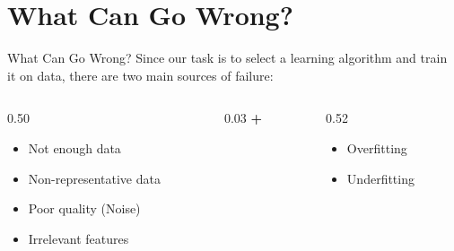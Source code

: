 \section{What Can Go Wrong?}
\begin{frame}{What Can Go Wrong?}
    Since our task is to select a learning algorithm and train it on data, there are two main sources of failure:
    \vspace{1em}
    \begin{columns}[c]
        \begin{column}{0.50\textwidth}
            \centering
            \begin{tcolorbox}[colback=red!5, colframe=red!60, title=\textbf{1. Bad Data}]
                \begin{itemize}
                    \item Not enough data
                    \item Non-representative data
                    \item Poor quality (Noise)
                    \item Irrelevant features
                \end{itemize}
            \end{tcolorbox}
        \end{column}
        \begin{column}{0.03\textwidth}
            \centering \textbf{+}
        \end{column}
        \begin{column}{0.52\textwidth}
            \centering
            \begin{tcolorbox}[colback=blue!5, colframe=blue!60, title=\textbf{2. Bad Algorithm}]
                \begin{itemize}
                    \item Overfitting
                    \item Underfitting
                \end{itemize}
            \end{tcolorbox}
        \end{column}
    \end{columns}
\end{frame}


